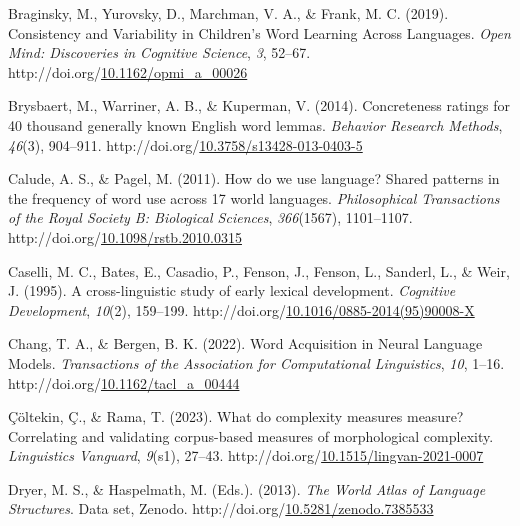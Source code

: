 \documentclass[10pt, letterpaper]{article}
\newlength{\cslhangindent}
\newlength{\cslentryspacingunit} %
\newenvironment{CSLReferences}[2] %
{%
	\setlength{\parindent}{0pt}
	\ifodd #1
	\let\oldpar\par
	\def\par{\hangindent=\cslhangindent\oldpar}
	\fi
}%
{}
\begin{document}
\begin{CSLReferences}{1}{0}
\leavevmode{}%
Braginsky, M., Yurovsky, D., Marchman, V. A., \& Frank, M. C. (2019).
Consistency and {Variability} in {Children}'s {Word Learning Across
Languages}. \emph{Open Mind: Discoveries in Cognitive Science},
\emph{3}, 52--67.
http://doi.org/\href{https://doi.org/10.1162/opmi_a_00026}{10.1162/opmi\_a\_00026}

\leavevmode{}%
Brysbaert, M., Warriner, A. B., \& Kuperman, V. (2014). Concreteness
ratings for 40 thousand generally known {English} word lemmas.
\emph{Behavior Research Methods}, \emph{46}(3), 904--911.
http://doi.org/\href{https://doi.org/10.3758/s13428-013-0403-5}{10.3758/s13428-013-0403-5}

\leavevmode{}%
Calude, A. S., \& Pagel, M. (2011). How do we use language? {Shared}
patterns in the frequency of word use across 17 world languages.
\emph{Philosophical Transactions of the Royal Society B: Biological
Sciences}, \emph{366}(1567), 1101--1107.
http://doi.org/\href{https://doi.org/10.1098/rstb.2010.0315}{10.1098/rstb.2010.0315}

\leavevmode{}%
Caselli, M. C., Bates, E., Casadio, P., Fenson, J., Fenson, L., Sanderl,
L., \& Weir, J. (1995). A cross-linguistic study of early lexical
development. \emph{Cognitive Development}, \emph{10}(2), 159--199.
http://doi.org/\href{https://doi.org/10.1016/0885-2014(95)90008-X}{10.1016/0885-2014(95)90008-X}

\leavevmode{}%
Chang, T. A., \& Bergen, B. K. (2022). Word {Acquisition} in {Neural
Language Models}. \emph{Transactions of the Association for
Computational Linguistics}, \emph{10}, 1--16.
http://doi.org/\href{https://doi.org/10.1162/tacl_a_00444}{10.1162/tacl\_a\_00444}

\leavevmode{}%
Çöltekin, Ç., \& Rama, T. (2023). What do complexity measures measure?
{Correlating} and validating corpus-based measures of morphological
complexity. \emph{Linguistics Vanguard}, \emph{9}(s1), 27--43.
http://doi.org/\href{https://doi.org/10.1515/lingvan-2021-0007}{10.1515/lingvan-2021-0007}

\leavevmode{}%
Dryer, M. S., \& Haspelmath, M. (Eds.). (2013). \emph{The {World Atlas}
of {Language Structures}}. Data set, {Zenodo}.
http://doi.org/\href{https://doi.org/10.5281/zenodo.7385533}{10.5281/zenodo.7385533}


\end{CSLReferences}
\end{document}
